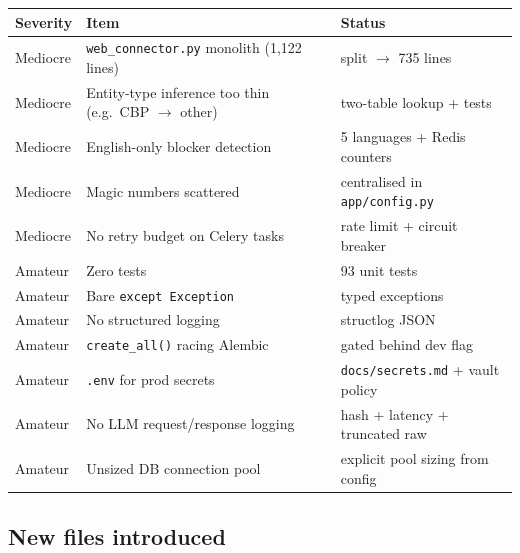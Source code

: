 \documentclass[11pt,a4paper]{article}
\begin{document}
\begin{center}
\footnotesize
\begin{tabularx}{\linewidth}{@{}l X l@{}}
\toprule
\textbf{Severity} & \textbf{Item} & \textbf{Status} \\
\midrule
Mediocre & \texttt{web\_connector.py} monolith (1{,}122 lines) &
  \textcolor{ok}{split $\rightarrow$ 735 lines} \\
Mediocre & Entity-type inference too thin (e.g.\ CBP $\rightarrow$ other) &
  \textcolor{ok}{two-table lookup + tests} \\
Mediocre & English-only blocker detection &
  \textcolor{ok}{5 languages + Redis counters} \\
Mediocre & Magic numbers scattered &
  \textcolor{ok}{centralised in \texttt{app/config.py}} \\
Mediocre & No retry budget on Celery tasks &
  \textcolor{ok}{rate limit + circuit breaker} \\
\midrule
Amateur  & Zero tests &
  \textcolor{ok}{93 unit tests} \\
Amateur  & Bare \texttt{except Exception} &
  \textcolor{ok}{typed exceptions} \\
Amateur  & No structured logging &
  \textcolor{ok}{structlog JSON} \\
Amateur  & \texttt{create\_all()} racing Alembic &
  \textcolor{ok}{gated behind dev flag} \\
Amateur  & \texttt{.env} for prod secrets &
  \textcolor{ok}{\texttt{docs/secrets.md} + vault policy} \\
Amateur  & No LLM request/response logging &
  \textcolor{ok}{hash + latency + truncated raw} \\
Amateur  & Unsized DB connection pool &
  \textcolor{ok}{explicit pool sizing from config} \\
\bottomrule
\end{tabularx}
\end{center}

\subsection{New files introduced}
\end{document}
